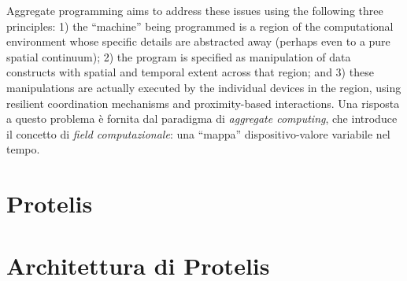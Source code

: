 Aggregate programming aims to address these issues using the following
three principles:
1) the “machine” being programmed is a region of
the computational environment whose specific
details are abstracted away (perhaps even to a
pure spatial continuum);
2) the program is specified as manipulation of
data constructs with spatial and temporal extent
across that region; and
3) these manipulations are actually executed by the
individual devices in the region, using resilient
coordination mechanisms and proximity-based
interactions.
Una risposta a questo problema è fornita dal paradigma di \textit{aggregate
  computing}, che introduce il concetto di \textit{field computazionale}: una
``mappa'' dispositivo-valore variabile nel tempo. \section{Protelis}
\section{Architettura di Protelis}
